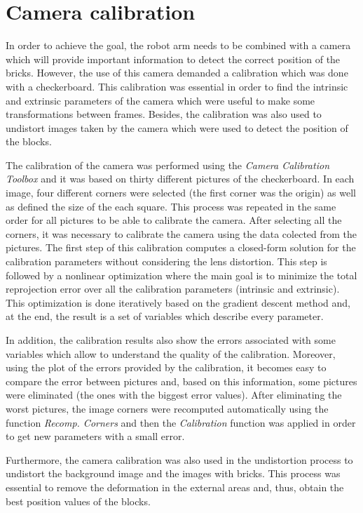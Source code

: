 \chapter{Camera calibration}\label{ch:calibration}

In order to achieve the goal, the robot arm needs to be combined with a camera which will provide important information to detect the correct position of the bricks. However, the use of this camera demanded a calibration which was done with a checkerboard. This calibration was essential in order to find the intrinsic and extrinsic parameters of the camera which were useful to make some transformations between frames. Besides, the calibration was also used to undistort images taken by the camera which were used to detect the position of the blocks.

The calibration of the camera was performed using the \textit{Camera Calibration Toolbox} and it was based on thirty different pictures of the checkerboard. In each image, four different corners were selected (the first corner was the origin) as well as defined the size of the each square. This process was repeated in the same order for all pictures to be able to calibrate the camera. After selecting all the corners, it was necessary to calibrate the camera using the data colected from the pictures. The first step of this calibration computes a closed-form solution for the calibration parameters without considering the lens distortion. This step is followed by a nonlinear optimization where the main goal is to minimize the total reprojection error over all the calibration parameters (intrinsic and extrinsic). This optimization is done iteratively based on the gradient descent method and, at the end, the result is a set of variables which describe every parameter. 

In addition, the calibration results also show the errors associated with some variables which allow to understand the quality of the calibration. Moreover, using the plot of the errors provided by the calibration, it becomes easy to compare the error between pictures and, based on this information, some pictures were eliminated (the ones with the biggest error values). After eliminating the worst pictures, the image corners were recomputed automatically using the function \textit{Recomp. Corners} and then the \textit{Calibration} function was applied in order to get new parameters with a small error.

Furthermore, the camera calibration was also used in the undistortion process to undistort the background image and the images with bricks. This process was essential to remove the deformation in the external areas and, thus, obtain the best position values of the blocks. \par



